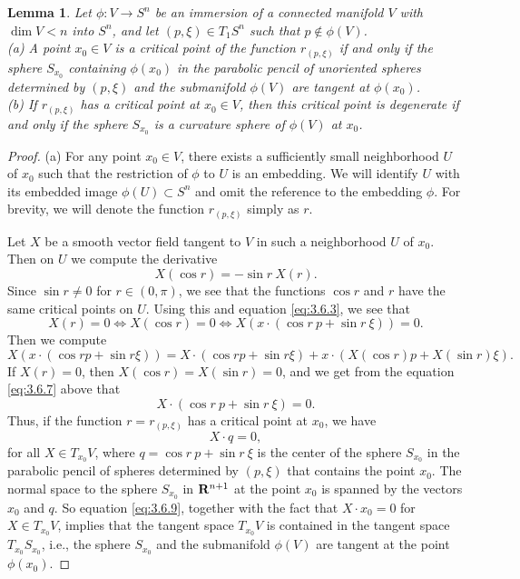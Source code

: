 \documentclass[12pt]{article}
\newtheorem{lemma}{Lemma}[section]
\begin{document}
\begin{lemma}
\label{lem:3.6.3} 
Let $\phi:V \rightarrow S^n$ be an immersion of a connected manifold $V$ with $\dim V < n$ into $S^n$, 
and let $(p, \xi) \in T_1S^n$
such that $p \notin \phi (V)$.\\ 
{\rm (a)} A point $x_0 \in V$ is a critical point of the function $r_{(p,\xi)}$ if and only if the sphere
$S_{x_0}$ containing $\phi(x_0)$ in the parabolic pencil of unoriented spheres
determined by $(p,\xi)$ and the submanifold $\phi (V)$ are
tangent at $\phi (x_0)$.\\
{\rm (b)} If $r_{(p,\xi)}$ has a critical point at $x_0 \in V$, then this critical point is degenerate if and only
if the sphere $S_{x_0}$ is a curvature sphere of $\phi (V)$ at $x_0$.
\end{lemma}
\begin{proof}
(a) For any point $x_0 \in V$, there exists a sufficiently small neighborhood $U$ of $x_0$ such that the
restriction of $\phi$ to $U$ is an embedding. We will identify $U$ with its embedded image
$\phi (U) \subset S^n$ and omit the reference to the embedding $\phi$. For brevity, we will denote the
function $r_{(p,\xi)}$ simply as $r$.

Let $X$ be a
smooth vector field tangent to $V$ in such a neighborhood $U$ of $x_0$.  Then on $U$ we compute the derivative
\begin{equation}
\label{eq:3.6.5}
X(\cos r) = - \sin r \ X(r).
\end{equation}
Since $\sin r \neq 0$ for $r \in (0, \pi)$, we see that the functions $\cos r$ and $r$ have the same critical
points on $U$.  Using this and equation \eqref{eq:3.6.3}, we see that
\begin{equation}
\label{eq:3.6.6}
X(r) = 0 \Leftrightarrow X(\cos r) = 0 \Leftrightarrow X(x \cdot (\cos r\  p + \sin r\  \xi)) = 0.
\end{equation}
Then we compute
\begin{equation}
\label{eq:3.6.7}
X(x \cdot (\cos r p + \sin r \xi)) = X \cdot (\cos r p + \sin r \xi) + x \cdot (X(\cos r) p + X(\sin r) \xi).
\end{equation}
If $X(r) = 0$, then $X(\cos r) = X(\sin r) = 0$, and we get from the equation \eqref{eq:3.6.7} above that
\begin{equation}
\label{eq:3.6.8}
X \cdot (\cos r\  p + \sin r\  \xi) = 0.
\end{equation}
Thus, if the function $r = r_{(p,\xi)}$ has a critical point at $x_0$, we have
\begin{equation}
\label{eq:3.6.9}
X \cdot q = 0,
\end{equation}
for all $X \in T_{x_0}V$, where $ q = \cos r\  p + \sin r\  \xi$ is the center of the sphere $S_{x_0}$ in the parabolic
pencil of spheres determined by $(p, \xi)$ that contains the point $x_0$.  The normal space 
to the sphere $S_{x_0}$ in
${\bf R}^{n+1}$ at the point $x_0$
is spanned by the vectors $x_0$ and $q$.  So equation \eqref{eq:3.6.9}, together with the fact that
$X \cdot x_0 = 0$ for $X \in T_{x_0}V$, implies that the tangent space $T_{x_0}V$ is contained in the tangent
space $T_{x_0}S_{x_0}$, i.e., the sphere $S_{x_0}$ and the submanifold $\phi (V)$ are tangent at the point $\phi (x_0)$.


\end{proof}
\end{document}
